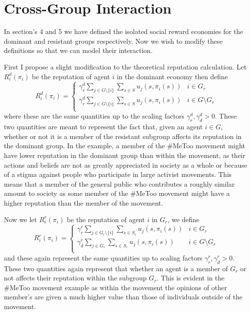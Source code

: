 \documentclass[12pt]{article}
\begin{document}
\section{Cross-Group Interaction}
In section's 4 and 5 we have defined the isolated social reward economies for the dominant and resistant groups respectively.
Now we wish to modify these definitions so that we can model their interaction.

First I propose a slight modification to the theoretical reputation calculation.
Let $R_i^d(\pi_i)$ be the reputation of agent $i$ in the dominant economy then define
\[ R_i^d(\pi_i) = \begin{cases}
    \gamma^{d}_r\displaystyle\sum_{j \in G \setminus \{ i \}}\sum_{s \in S}u_j(s, \pi_i(s)) & i \in G_r \\
    \gamma^d_r\displaystyle\sum_{j \in G \setminus \{ i \}}\sum_{s \in S}u_j(s, \pi_i(s)) & i \in G \setminus G_r \\
\end{cases} \]
where these are the same quantities up to the scaling factors $\gamma^d_r, \gamma^d_d > 0$. These two quantities
are meant to represent the fact that, given an agent $i \in G$, whether or not it is a member of the resistant subgroup
affects its reputation in the dominant group. In the example, a member of the \#MeToo movement
might have lower reputation in the dominant group than within the movement, as their actions and beliefs are not as greatly
appreciated in society as a whole or because of a stigma against people who participate in large activist movements.
This means that a member of the general public who contributes a roughly similar amount to society as some member of the \#MeToo
movement might have a higher reputation than the member of the movement.

Now we let $R_i^r(\pi_i)$ be the reputation of agent $i$ in $G_r$, we define
\[ R_i^r(\pi_i) = \begin{cases}
    \gamma^r_r\displaystyle\sum_{j \in G_r \setminus \{ i \}}\sum_{s \in S_r}u_j(s, \pi_i(s)) & i \in G_r \\
    \gamma^r_d\displaystyle\sum_{j \in G_r}\sum_{s \in S_r}u_j(s, \pi_i(s)) & i \in G \setminus G_r \\
\end{cases} \]
and these again represent the same quantities up to scaling factors $\gamma_r^r, \gamma^r_d > 0$. These two
quantities again represent that whether an agent is a member of $G_r$ or not affects their reputation within the subgroup $G_r$.
This is evident in the \#MeToo movement example as within the movement the opinions of other member's are given a much higher value
than those of individuals outside of the movement.
\end{document}
